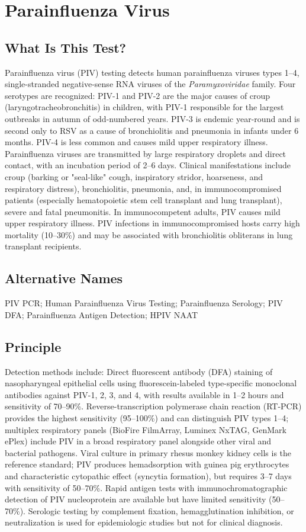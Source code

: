 \chapter{Parainfluenza Virus}

\section*{What Is This Test?}
Parainfluenza virus (PIV) testing detects human parainfluenza viruses types 1--4, single-stranded negative-sense RNA viruses of the \textit{Paramyxoviridae} family. Four serotypes are recognized: PIV-1 and PIV-2 are the major causes of croup (laryngotracheobronchitis) in children, with PIV-1 responsible for the largest outbreaks in autumn of odd-numbered years. PIV-3 is endemic year-round and is second only to RSV as a cause of bronchiolitis and pneumonia in infants under 6 months. PIV-4 is less common and causes mild upper respiratory illness. Parainfluenza viruses are transmitted by large respiratory droplets and direct contact, with an incubation period of 2--6 days. Clinical manifestations include croup (barking or "seal-like" cough, inspiratory stridor, hoarseness, and respiratory distress), bronchiolitis, pneumonia, and, in immunocompromised patients (especially hematopoietic stem cell transplant and lung transplant), severe and fatal pneumonitis. In immunocompetent adults, PIV causes mild upper respiratory illness. PIV infections in immunocompromised hosts carry high mortality (10--30\%) and may be associated with bronchiolitis obliterans in lung transplant recipients.

\section*{Alternative Names}
PIV PCR; Human Parainfluenza Virus Testing; Parainfluenza Serology; PIV DFA; Parainfluenza Antigen Detection; HPIV NAAT

\section*{Principle}
Detection methods include: Direct fluorescent antibody (DFA) staining of nasopharyngeal epithelial cells using fluorescein-labeled type-specific monoclonal antibodies against PIV-1, 2, 3, and 4, with results available in 1--2 hours and sensitivity of 70--90\%. Reverse-transcription polymerase chain reaction (RT-PCR) provides the highest sensitivity (95--100\%) and can distinguish PIV types 1--4; multiplex respiratory panels (BioFire FilmArray, Luminex NxTAG, GenMark ePlex) include PIV in a broad respiratory panel alongside other viral and bacterial pathogens. Viral culture in primary rhesus monkey kidney cells is the reference standard; PIV produces hemadsorption with guinea pig erythrocytes and characteristic cytopathic effect (syncytia formation), but requires 3--7 days with sensitivity of 50--70\%. Rapid antigen tests with immunochromatographic detection of PIV nucleoprotein are available but have limited sensitivity (50--70\%). Serologic testing by complement fixation, hemagglutination inhibition, or neutralization is used for epidemiologic studies but not for clinical diagnosis.

